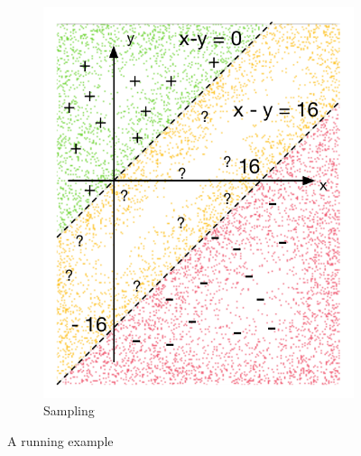 \begin{figure}[t]
\begin{subfigure}{.5\textwidth}
      \includegraphics[scale=0.42]{figures/running-sampling.pdf}
      \caption{Sampling}
      \label{fig:running:example:sampling}
\end{subfigure}
\caption{A running example}
\label{fig:running:example}
\end{figure}


